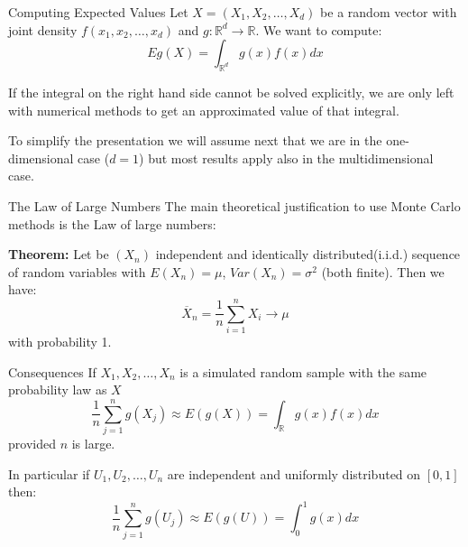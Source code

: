 \documentclass[8pt]{beamer}
\begin{document}
\begin{frame}{Computing Expected Values}
Let $X=(X_1,X_2,\ldots,X_d)$ be a random vector with joint density $f(x_1,x_2,\ldots,x_d)$ and $g: \mathbb{R}^d \rightarrow \mathbb{R}$. We want to compute:
\begin{equation*}
    E g(X)= \int_{\mathbb{R}^d} g(x)f(x) dx
\end{equation*}

If the integral on the right hand side cannot be solved explicitly, we are only left with numerical methods to get an approximated value of that integral. 
\vspace{3mm}

To simplify the presentation we will assume next that we are in the one-dimensional case ($d=1$) but most results apply also in the multidimensional case.
\end{frame}

\begin{frame}{The Law of Large Numbers}
The main theoretical justification to use Monte Carlo methods is the Law of large numbers:

\vspace{3mm}

{\bf Theorem:} Let be $(X_n)$ independent and identically distributed(i.i.d.) sequence of random variables with 
$E(X_n)=\mu$, $Var(X_n)=\sigma^2$ (both finite). Then we have:\\
\begin{equation*}
\overline{X}_n=\frac{1}{n} \sum_{i=1}^n X_i\rightarrow \mu
\end{equation*}
with probability 1.
\end{frame}

\begin{frame}{Consequences}
If $X_1,X_2,\ldots,X_n$ is a simulated random sample with the same probability law as $X$  \\
\begin{equation*}
    \frac{1}{n} \sum_{j=1}^n g(X_j) \approx E(g(X))=\int_{\mathbb{R}} g(x)f(x) dx
\end{equation*}
provided $n$ is large.

\vspace{3mm}

In particular if $U_1,U_2,\ldots,U_n$ are independent and uniformly distributed on $[0,1]$ then:
\begin{equation*}
    \frac{1}{n} \sum_{j=1}^n g(U_j) \approx E(g(U))=\int_{0}^1 g(x) dx
\end{equation*}
\end{frame}
\end{document}
